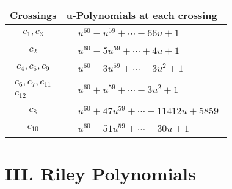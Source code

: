 \documentclass[1p]{elsarticle_modified}
\theoremstyle{definition}
\begin{document}
\begin{tabular}{m{50pt}|m{274pt}}
Crossings & \hspace{64pt}u-Polynomials at each crossing \\
\hline $$\begin{aligned}c_{1},c_{3}\end{aligned}$$&$\begin{aligned}
&u^{60}- u^{59}+\cdots-66 u+1
\end{aligned}$\\
\hline $$\begin{aligned}c_{2}\end{aligned}$$&$\begin{aligned}
&u^{60}-5 u^{59}+\cdots+4 u+1
\end{aligned}$\\
\hline $$\begin{aligned}c_{4},c_{5},c_{9}\end{aligned}$$&$\begin{aligned}
&u^{60}-3 u^{59}+\cdots-3 u^2+1
\end{aligned}$\\
\hline $$\begin{aligned}c_{6},c_{7},c_{11}\\c_{12}\end{aligned}$$&$\begin{aligned}
&u^{60}+u^{59}+\cdots-3 u^2+1
\end{aligned}$\\
\hline $$\begin{aligned}c_{8}\end{aligned}$$&$\begin{aligned}
&u^{60}+47 u^{59}+\cdots+11412 u+5859
\end{aligned}$\\
\hline $$\begin{aligned}c_{10}\end{aligned}$$&$\begin{aligned}
&u^{60}-51 u^{59}+\cdots+30 u+1
\end{aligned}$\\
\hline
\end{tabular}\newpage\renewcommand{\arraystretch}{1}
\centering \section*{ III. Riley Polynomials}
\end{document}
